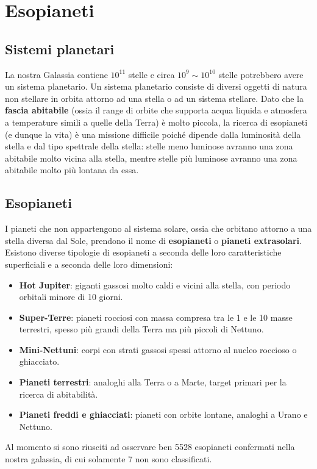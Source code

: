 \documentclass[a4paper, oneside]{book}
\begin{document}
\chapter{Esopianeti}
\section{Sistemi planetari}
La nostra Galassia contiene $10^{11}$ stelle e circa $10^{9} \sim 10^{10}$ stelle 
potrebbero avere un sistema planetario.
Un sistema planetario consiste di diversi oggetti di natura non stellare in orbita attorno ad una stella o ad un sistema stellare.
Dato che la \textbf{fascia abitabile} (ossia il range di orbite che 
supporta acqua liquida e atmosfera a temperature simili a quelle della Terra)
è molto piccola, la ricerca di esopianeti (e dunque la vita) è una missione 
difficile poiché dipende dalla luminosità della stella e dal tipo spettrale della stella: 
stelle meno luminose avranno una zona abitabile molto vicina alla stella, 
mentre stelle più luminose avranno una zona abitabile molto più lontana da essa.

\section{Esopianeti}
I pianeti che non appartengono al sistema solare, ossia che orbitano attorno a una stella diversa dal Sole,
prendono il nome di \textbf{esopianeti} o \textbf{pianeti extrasolari}. Esistono diverse tipologie 
di esopianeti a seconda delle loro caratteristiche superficiali e a seconda delle loro dimensioni:
\begin{itemize}
    \item \textbf{Hot Jupiter}: giganti gassosi molto caldi e vicini alla stella, 
    con periodo orbitali minore di 10 giorni.
    \item \textbf{Super-Terre}: pianeti rocciosi con massa compresa tra le 1 e le 10
    masse terrestri, spesso più grandi della Terra ma più piccoli di Nettuno.
    \item \textbf{Mini-Nettuni}: corpi con strati gassosi spessi attorno al nucleo roccioso o ghiacciato.
    \item \textbf{Pianeti terrestri}: analoghi alla Terra o a Marte, target primari per la ricerca di abitabilità.
    \item \textbf{Pianeti freddi e ghiacciati}: pianeti con orbite lontane, analoghi a Urano e Nettuno.
\end{itemize}
Al momento si sono riusciti ad osservare ben 5528 esopianeti confermati nella nostra galassia, di cui 
solamente 7 non sono classificati.
\end{document}
